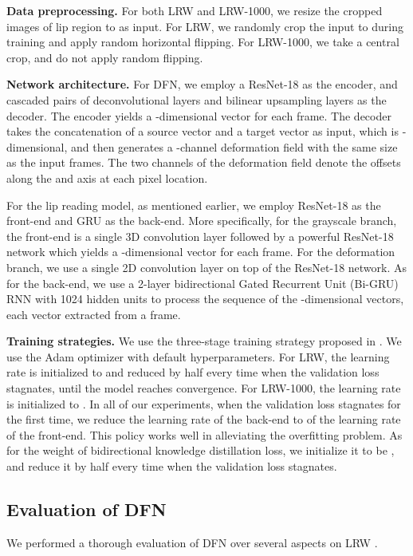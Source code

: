 \documentclass[a4paper, 10pt, conference]{ieeeconf}      \usepackage{FG2020}
\begin{document}
 \textbf{Data preprocessing.}  For both LRW and LRW-1000, we resize the cropped images of lip region to  as input. For LRW, we randomly crop the input to  during training and apply random horizontal flipping. For LRW-1000, we take a central  crop, and do not apply random flipping.
 
 \textbf{Network architecture.} For DFN, we employ a ResNet-18 \cite{he2016deep} as the encoder, and  cascaded pairs of deconvolutional layers and bilinear upsampling layers as the decoder. The encoder yields a -dimensional vector for each frame. The decoder takes the concatenation of a source vector  and a target vector  as input, which is -dimensional, and then generates a -channel deformation field with the same size as the input frames. The two channels of the deformation field  denote  the offsets along the  and  axis at each pixel location. 
 
 For the lip reading model, as mentioned earlier, we employ ResNet-18 as the front-end and GRU as the back-end. More specifically, for the grayscale branch, the front-end is a single 3D convolution layer followed by a powerful ResNet-18 network which yields a -dimensional vector for each frame. For the deformation branch, we use a single 2D convolution layer on top of the ResNet-18 network. As for the back-end, we use  a 2-layer bidirectional Gated Recurrent Unit (Bi-GRU) RNN with 1024 hidden units to process the sequence of the -dimensional vectors, each vector extracted from a frame. 
 
 \textbf{Training strategies.} We use the three-stage training strategy proposed in \cite{Stafylakis2017CombiningRN}. We use the Adam optimizer with default hyperparameters. For LRW, the learning rate is initialized to  and reduced by half every time when the validation loss stagnates, until the model reaches convergence. For LRW-1000, the learning rate is initialized to . In all of our experiments, when the validation loss stagnates for the first time, we reduce  the learning rate of the back-end to  of the learning rate of the front-end. This policy works well in alleviating the overfitting problem. As for the weight of bidirectional knowledge distillation loss, we initialize it to be , and reduce it by half every time when the validation loss stagnates.
 
 \subsection{Evaluation of DFN}
 \label{subsec:exp_dfn}
 We performed a thorough evaluation of DFN over several aspects on LRW \cite{Chung2016LipRI}. 
 
\end{document}
